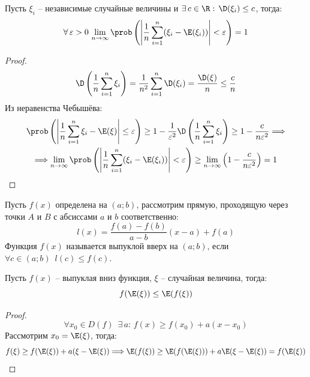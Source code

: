 \documentclass[12pt]{article}
\begin{document}
\begin{theorem}
    Пусть $\xi_i$ -- независимые случайные величины и $\exists\,c\in\R:\,\D(\xi_i)\leq c$, тогда:
    $$\forall\,\varepsilon>0\, \lim_{n\to\infty}\prob\left(\left|\frac{1}{n}\sum_{i=1}^{n}(\xi_i-\E(\xi_i))\right|<\varepsilon\right)=1$$
\end{theorem}
\begin{proof}
    $$\D\left(\frac{1}{n}\sum_{i=1}^{n}\xi_i\right)=\frac{1}{n^2}\sum_{i=1}^{n}\D(\xi_i)=\frac{\D(\xi)}{n}\leq\frac{c}{n}$$
    Из неравенства Чебышёва:
    \begin{multline*}
        \prob\left(\left|\frac{1}{n}\sum_{i=1}^{n}\xi_i-\E(\xi)\right|\leq\varepsilon\right)\geq1-\frac{1}{\varepsilon^2}\D\left(\frac{1}{n}\sum_{i=1}^{n}\xi_i\right)\geq1-\frac{c}{n\varepsilon^2}\Longrightarrow\\
        \Longrightarrow\lim_{n\to\infty}\prob\left(\left|\frac{1}{n}\sum_{i=1}^{n}(\xi_i-\E(\xi_i))\right|<\varepsilon\right)\geq\lim_{n\to\infty}\left(1-\frac{c}{n\varepsilon^2}\right)=1
    \end{multline*}
\end{proof}
\begin{definition}
    Пусть $f(x)$ определена на $(a;b)$, рассмотрим прямую, проходящую через точки $A$ и $B$ с абсиссами $a$ и $b$ соответственно: 
    $$l(x)=\frac{f(a)-f(b)}{a-b}(x-a)+f(a)$$
    Функция $f(x)$ называется выпуклой вверх на $(a;b)$, если $\forall c\in(a;b)\enspace l(c)\leq f(c)$.
\end{definition}
\begin{theorem}
    Пусть $f(x)$ -- выпуклая вниз функция, $\xi$ -- случайная величина, тогда:
    $$f(\E(\xi))\leq \E(f(\xi))$$
\end{theorem}
\begin{proof}
    $$\forall x_0\in D(f)\enspace \exists\,a:\,f(x)\geq f(x_0)+a(x-x_0)$$
    Рассмотрим $x_0=\E(\xi)$, тогда:
    $$f(\xi)\geq f(\E(\xi))+a(\xi-\E(\xi))\Longrightarrow \E(f(\xi))\geq \E(f(\E(\xi)))+a\E(\xi-\E(\xi))=f(\E(\xi))$$
\end{proof}
\end{document}
